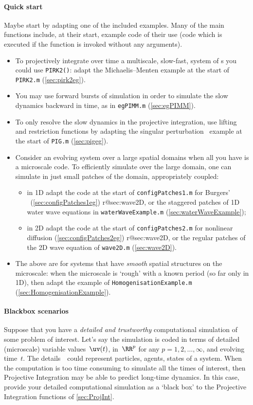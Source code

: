 \paragraph{Quick start}
Maybe start by adapting one of the included examples. Many of the main functions include, at their start, example code of their use (code which is executed if the function is invoked without any arguments).
\begin{itemize}
\item To projectively integrate over time a multiscale, slow-fast, system of \ode{}s you could use \verb|PIRK2()|: adapt the Michaelis--Menten example at the start of \verb|PIRK2.m| (\cref{sec:pirk2eg}).
\item You may use forward bursts of simulation in order to simulate the slow dynamics backward in time, as in \verb|egPIMM.m| (\cref{sec:egPIMM}).
\item To only resolve the slow dynamics in the projective integration, use lifting and restriction functions by adapting the singular perturbation \ode\ example at the start of \verb|PIG.m| (\cref{sec:pigeg}).
\item Consider an evolving system over a large spatial domains when all you have is a microscale code.  To efficiently simulate over the large domain, one can simulate in just small patches of the domain, appropriately coupled:
\begin{itemize}
\item in 1D adapt the code at the start of \verb|configPatches1.m| for Burgers' \pde\ (\cref{sec:configPatches1eg})%
\ifcsname r@sec:wave2D\endcsname, or the staggered patches of 1D water wave equations in \verb|waterWaveExample.m| (\cref{sec:waterWaveExample})\fi;
\item in 2D adapt the code at the start of \verb|configPatches2.m| for nonlinear diffusion (\cref{sec:configPatches2eg})%
\ifcsname r@sec:wave2D\endcsname, or the regular patches of the 2D wave equation of \verb|wave2D.m| (\cref{sec:wave2D})\fi.
\end{itemize}
\item The above are for systems that have \emph{smooth} spatial structures on the microscale: when the microscale is `rough' with a known period (so far only in 1D), then adapt 
the example of \verb|HomogenisationExample.m| (\cref{sec:HomogenisationExample}).
\end{itemize}


\paragraph{Blackbox scenarios} 
Suppose that you have a \emph{detailed and trustworthy} computational simulation of some problem of interest.
Let's say the simulation is coded in terms of detailed (microscale) variable values~\(\uv(t)\), in~\(\RR^{p}\) for any \(p=1,2,\ldots,\infty\), and evolving time~\(t\).
The details~\uv\ could represent particles, agents, states of a system.
When the computation is too time consuming to simulate all the times of interest, then Projective Integration may be able to predict long-time dynamics.  
In this case, provide your detailed computational simulation as a `black box' to the Projective Integration functions of \cref{sec:ProjInt}.

